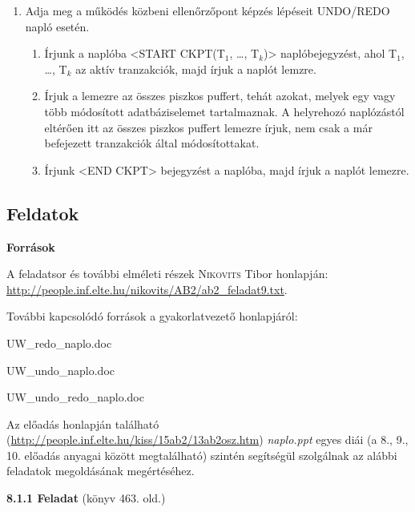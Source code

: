 \documentclass[a4paper,11.5pt, table]{article}
\begin{document}
\begin{enumerate}
	\item Adja meg a működés közbeni ellenőrzőpont képzés lépéseit UNDO/REDO napló esetén.
		\begin{enumerate}
			\item Írjunk a naplóba <START CKPT(T$_{1}$, \ldots , T$_{k}$)> naplóbejegyzést, ahol T$_{1}$, \ldots , T$_{k}$ az aktív tranzakciók, majd írjuk a naplót lemzre.
			\item Írjuk a lemezre az összes piszkos puffert, tehát azokat, melyek egy vagy több módosított adatbáziselemet tartalmaznak. A helyrehozó naplózástól eltérően itt az összes piszkos puffert lemezre írjuk, nem csak a már befejezett tranzakciók által módosítottakat.
			\item Írjunk <END CKPT> bejegyzést a naplóba, majd írjuk a naplót lemezre.
		\end{enumerate}
\end{enumerate}

\subsection{Feldatok}
	
	{\large \textbf{Források}}
	\begin{compactitem}
	\item A feladatsor és további elméleti részek \textsc{Nikovits} Tibor honlapján: \url{http://people.inf.elte.hu/nikovits/AB2/ab2_feladat9.txt}.
	
	\item További kapcsolódó források a gyakorlatvezető honlapjáról:
	\begin{compactitem}
		\item UW\_redo\_naplo.doc
		\item UW\_undo\_naplo.doc
		\item UW\_undo\_redo\_naplo.doc
	\end{compactitem}
	
	\item Az előadás honlapján található (\url{http://people.inf.elte.hu/kiss/15ab2/13ab2osz.htm}) \textit{naplo.ppt} egyes diái (a 8., 9., 10. előadás anyagai között megtalálható) szintén segítségül szolgálnak az alábbi feladatok megoldásának megértéséhez. 
	\end{compactitem}
	
	
	{\large \textbf{8.1.1 Feladat}} (könyv 463. old.)
	
\end{document}
